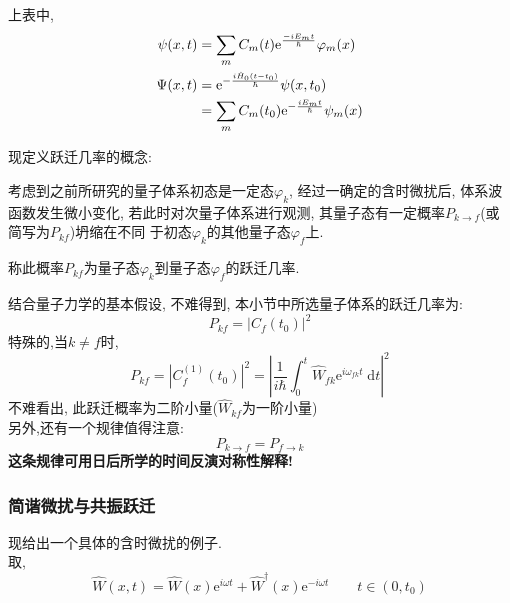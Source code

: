 \documentclass[a4paper, 11pt]{article}
\begin{document}
\begin{spacing}{1.2}
          上表中, 
          \begin{subequations}
            \begin{align} 
              \psi(x,t) & = \sum_mC_m(t)\mathrm{e}^\frac{-iE_mt}{\hbar}\varphi_m(x) \\ 
              \Psi(x,t) & = \mathrm{e}^{-\frac{i\hat{H}_0(t-t_0)}{\hbar}}\psi(x, t_0)\\
                        & = \sum_mC_m(t_0)\mathrm{e}^{-\frac{iE_mt}{\hbar}}\psi_m(x)  \notag 
            \end{align}
          \end{subequations}

          现定义跃迁几率的概念:
          \par
          考虑到之前所研究的量子体系初态是一定态$\varphi_k$, 经过一确定的含时微扰后, 体系波函数发生微小变化,
          若此时对次量子体系进行观测, 其量子态有一定概率$P_{k\to f}$(或简写为$P_{kf}$)坍缩在不同
          于初态$\varphi_k$的其他量子态$\varphi_f$上.
          \par
          称此概率$P_{kf}$为量子态$\varphi_k$到量子态$\varphi_f$的跃迁几率.
          \par
          结合量子力学的基本假设, 不难得到, 本小节中所选量子体系的跃迁几率为:
          \begin{equation}
            P_{kf} = |C_f(t_0)|^2
          \end{equation}
          特殊的,当$k\ne f$时,
          \begin{equation}
            P_{kf} = |C_f^{(1)}(t_0)|^2 
                   = |\frac{1}{i\hbar}\int_0^t\hat{W}_{fk}\mathrm{e}^{i\omega_{fk}t}\;\mathrm{d}t|^2
          \end{equation}
          不难看出, 此跃迁概率为二阶小量($\hat{W}_{kf}$为一阶小量)\\
          另外,还有一个规律值得注意:
          \begin{equation}
            P_{k\to f} = P_{f\to k}
          \end{equation}
          \textbf{这条规律可用日后所学的时间反演对称性解释!}

        \subsubsection{简谐微扰与共振跃迁}
        \label{jianxieweirao}
        现给出一个具体的含时微扰的例子.\\
        取,
        \begin{equation}
          \hat{W}(x, t) = \hat{W}(x)\mathrm{e}^{i\omega{}t} 
                        + \hat{W}^\dag(x)\mathrm{e}^{-i\omega{}t} \qquad t \in (0, t_0)
        \end{equation}
        


\end{spacing}
\end{document}
